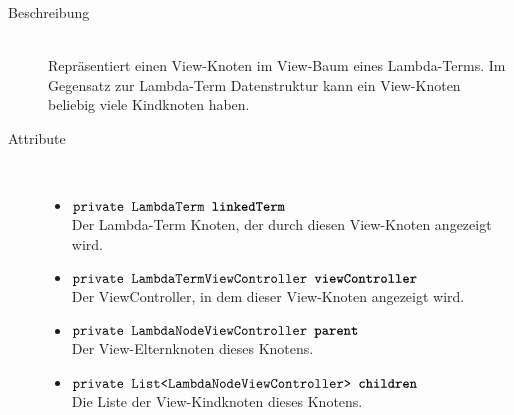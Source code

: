 \begin{description}
\item[Beschreibung] \hfill \\ Repräsentiert einen View-Knoten im View-Baum eines Lambda-Terms. Im Gegensatz zur Lambda-Term Datenstruktur kann ein View-Knoten beliebig viele Kindknoten haben.

\item[Attribute] \hfill \\
	\vspace{-.8cm}
	\begin{itemize}
		\item $\texttt{private LambdaTerm \textbf{linkedTerm}}$ \\ Der Lambda-Term Knoten, der durch diesen View-Knoten angezeigt wird.
		\item $\texttt{private LambdaTermViewController \textbf{viewController}}$ \\ Der ViewController, in dem dieser View-Knoten angezeigt wird.
		\item $\texttt{private LambdaNodeViewController \textbf{parent}}$ \\ Der View-Elternknoten dieses Knotens.
		\item $\texttt{private List<LambdaNodeViewController> \textbf{children}}$ \\ Die Liste der View-Kindknoten dieses Knotens.
	\end{itemize}
	

\end{description}
